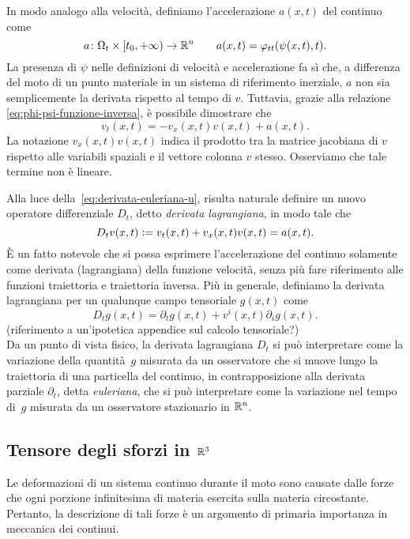 In modo analogo alla velocità,
definiamo l'accelerazione $a(x,t)$ del continuo come
\[
a \colon \Omega_t \times [t_0,+\infty) \to \mathbb{R}^n
\qquad a(x,t) = \varphi_{tt}(\psi(x,t),t).
\]
La presenza di $\psi$ nelle definizioni di velocità e accelerazione fa sì che,
a differenza del moto di un punto materiale in un sistema di
riferimento inerziale, $a$ non sia semplicemente la derivata rispetto
al tempo di $v$. Tuttavia, grazie alla relazione \eqref{eq:phi-psi-funzione-inversa},
è possibile dimostrare che
\begin{equation} \label{eq:derivata-euleriana-u}
v_t(x,t) = -v_x(x,t) v(x,t) + a(x,t).
\end{equation}
La notazione $v_x(x,t) v(x,t)$ indica il prodotto tra la matrice jacobiana
di $v$ rispetto alle variabili spaziali e il vettore colonna $v$ stesso.
Osserviamo che tale termine non è lineare.

Alla luce della~\eqref{eq:derivata-euleriana-u},
risulta naturale definire un nuovo operatore differenziale
$D_t$, detto \emph{derivata lagrangiana}, in modo tale che
\[
D_t v(x,t) \vcentcolon= v_t(x,t) + v_x(x,t) v(x,t) = a(x,t).
\]
È un fatto notevole che si possa esprimere
l'accelerazione del continuo solamente come derivata (lagrangiana)
della funzione velocità, senza più fare riferimento alle funzioni
traiettoria e traiettoria inversa.
Più in generale, definiamo la derivata lagrangiana per un qualunque
campo tensoriale $g(x,t)$ come
\begin{equation} \label{eq:derivata-lagrangiana}
D_t g(x,t) = \partial_t g(x,t) + v^i(x,t) \partial_i g(x,t).
\end{equation}
(riferimento a un'ipotetica appendice sul calcolo tensoriale?) \\
Da un punto di vista fisico, la derivata lagrangiana $D_t$ si può
interpretare come la variazione della quantità~$g$ misurata
da un osservatore che si muove lungo la traiettoria
di una particella del continuo, in contrapposizione alla derivata
parziale $\partial_t$, detta \emph{euleriana}, che si può interpretare
come la variazione nel tempo di~$g$ misurata da un osservatore
stazionario in $\mathbb{R}^n$.

\subsection*{Tensore degli sforzi in $\mathbb{R}^3$}

Le deformazioni di un sistema continuo durante il moto
sono causate dalle forze che ogni porzione infinitesima di materia
esercita sulla materia circostante.
Pertanto, la descrizione di tali forze è un argomento di primaria
importanza in meccanica dei continui.

